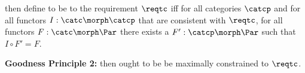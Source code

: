 \begin{definition}
 \IfSforCwithRCwords then define \catcw to be  to the requirement $\reqtc$ iff for all categories $\catcp$ and for all functors $I:\catc \morph \catcp$ that are consistent with $\reqtc$, for all functors $F: \catc \morph \Par$  there exists a  $F' : \catcp \morph \Par$ such that $I \circ F'=F$. 
\end{definition}

\textbf{Goodness Principle 2:}
\IfSforCwithRCwords then \catcw ought to be be maximally constrained to $\reqtc$. 

